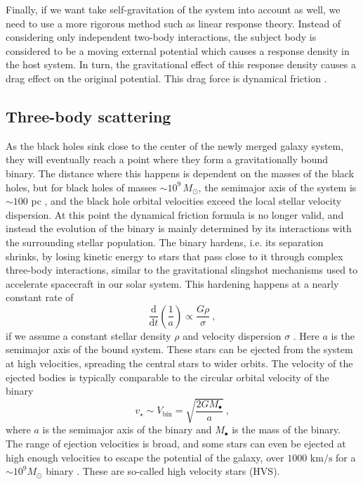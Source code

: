 \documentclass[english, oneside]{HYgradu}
\begin{document}
Finally, if we want take self-gravitation of the system into account as well, we need to use a more rigorous method such as linear response theory. Instead of considering only independent two-body interactions, the subject body is considered to be a moving external potential which causes a response density in the host system. In turn, the gravitational effect of this response density causes a drag effect on the original potential. This drag force is dynamical friction \citep{galform}. 


\subsection{Three-body scattering}

As the black holes sink close to the center of the newly merged galaxy system, they will eventually reach a point where they form a gravitationally bound binary. The distance where this happens is dependent on the masses of the black holes, but for black holes of masses $\sim 10^9 \, M_\odot$, the semimajor axis of the system is $\sim 100$ pc \citep{rantala:2018}, and the black hole orbital velocities exceed the local stellar velocity dispersion. At this point the dynamical friction formula is no longer valid, and instead the evolution of the binary is mainly determined by its interactions with the surrounding stellar population. The binary hardens, i.e. its separation shrinks, by losing kinetic energy to stars that pass close to it through complex three-body interactions, similar to the gravitational slingshot mechanisms used to accelerate spacecraft in our solar system. This hardening happens at a nearly constant rate of
\begin{equation}
\frac{\mathrm{d}}{\mathrm{d} t} \left( \frac{1}{a} \right) \propto \frac{G \rho}{\sigma}  \ ,
\end{equation}
if we assume a constant stellar density $\rho$ and velocity dispersion $\sigma$ \citep{quinlan:1996}. Here $a$ is the semimajor axis of the bound system. These stars can be ejected from the system at high velocities, spreading the central stars to wider orbits. The velocity of the ejected bodies is typically comparable to the circular orbital velocity of the binary
\begin{equation}
v_\star \sim V_{\mathrm{bin}} = \sqrt{\frac{2 G M_\bullet}{a}} \ ,
\end{equation}
where $a$ is the semimajor axis of the binary and $M_\bullet$ is the mass of the binary. The range of ejection velocities is broad, and some stars can even be ejected at high enough velocities to escape the potential of the galaxy, over $1000$ $\mathrm{km/s}$ for a $\sim 10^9 M_\odot$ binary \citep{rantala:2018}. These are so-called high velocity stars (HVS).
\end{document}
